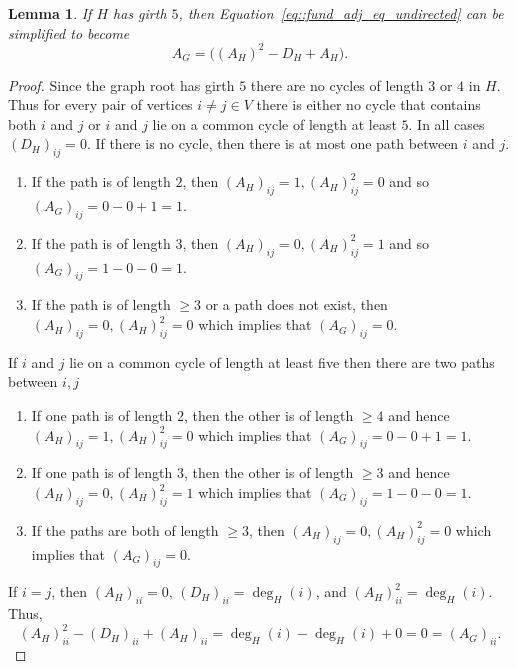 \documentclass[11pt]{article}
\newtheorem{lemma}{Lemma}
\begin{document}
\begin{lemma} \label{lemma::no_indicator_girth_5}
  If $H$ has girth $5$, then Equation~\eqref{eq::fund_adj_eq_undirected} can be simplified to become 
  \begin{equation} \label{eq::fund_adj_eq_undirected_no_indicator}
    A_G = \big((A_H)^2 - D_H + A_H\big).
  \end{equation}
\end{lemma}
\begin{proof}
  Since the graph root has girth $5$ there are no cycles of length $3$ or $4$ in $H$. Thus for every pair of vertices $i \neq j \in V$ there is either no cycle that contains both $i$ and $j$ or $i$ and $j$ lie on a common cycle of length at least $5$. In all cases $(D_H)_{ij} = 0$. If there is no cycle, then there is at most one path between $i$ and $j$. 
  \begin{enumerate}[label=\roman*)]
    \item If the path is of length $2$, then $(A_H)_{ij} = 1, (A_H)^2_{ij} = 0$ and so $(A_G)_{ij} = 0 - 0 + 1 = 1$.
    \item If the path is of length $3$, then $(A_H)_{ij} = 0, (A_H)^2_{ij} = 1$ and so $(A_G)_{ij} = 1 - 0 - 0 = 1$.
    \item If the path is of length $\geq 3$ or a path does not exist, then $(A_H)_{ij} = 0, (A_H)^2_{ij} = 0$ which implies that $(A_G)_{ij} = 0$.
  \end{enumerate}
  If $i$ and $j$ lie on a common cycle of length at least five then there are two paths between $i,j$
  \begin{enumerate}[label=\roman*)]
    \item If one path is of length $2$, then the other is of length $\geq 4$ and hence $(A_H)_{ij} = 1, (A_H)^2_{ij} = 0$ which implies that $(A_G)_{ij} = 0 - 0 + 1 = 1$.
    \item If one path is of length $3$, then the other is of length $\geq 3$ and hence $(A_H)_{ij} = 0, (A_H)^2_{ij} = 1$ which implies that $(A_G)_{ij} = 1 - 0 - 0 = 1$.
    \item If the paths are both of length $\geq 3$,  then $(A_H)_{ij} = 0, (A_H)^2_{ij} = 0$ which implies that $(A_G)_{ij} = 0$. 
  \end{enumerate}
  If $i = j$, then $(A_H)_{ii} = 0$, $(D_H)_{ii} = \deg_H(i)$, and $(A_H)^2_{ii} = \deg_H(i)$. Thus,
  \[
  (A_H)^2_{ii} - (D_H)_{ii} + (A_H)_{ii} = \deg_H(i) - \deg_H(i) + 0 = 0 = (A_G)_{ii}.
  \]
\end{proof}
\end{document}

